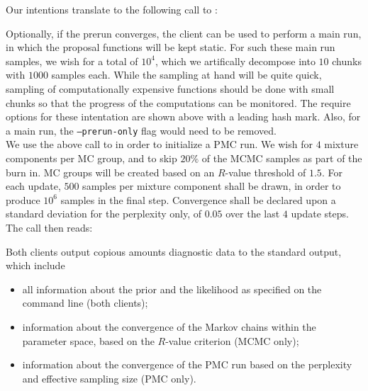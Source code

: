 Our intentions translate to the following call to :

Optionally, if the prerun converges, the client can be used to perform a main run, in which
the proposal functions will be kept static. For such these main run samples, we wish for a
total of $10^4$, which we artifically decompose
into $10$ chunks with $1000$ samples each. While the sampling at hand will be quite quick,
sampling of computationally expensive functions should be done with small chunks so that
the progress of the computations can be monitored. The require options for these intentation
are shown above with a leading hash mark. Also, for a main run,
the \texttt{--prerun-only} flag would need to be removed.\\

We use the above call to  in order to initialize a PMC
run. We wish for $4$ mixture components per MC group, and to skip $20\%$ of the
MCMC samples as part of the burn in. MC groups will be created based on an
$R$-value \cite{Gelman:1992zz} threshold of $1.5$. For each update, $500$
samples per mixture component shall be drawn, in order to produce $10^6$
samples in the final step. Convergence shall be declared upon a standard
deviation for the perplexity only, of $0.05$ over the last $4$ update steps.
The call then reads: 

Both clients output copious amounts diagnostic data to the standard output, which include
\begin{itemize}
    \item all information about the prior and the likelihood as specified on the command line (both clients);
    \item information about the convergence of the Markov chains within the parameter space,
    based on the $R$-value criterion \cite{Gelman:1992zz} (MCMC only);
    \item information about the convergence of the PMC run based on the perplexity and
    effective sampling size (PMC only).
\end{itemize}

